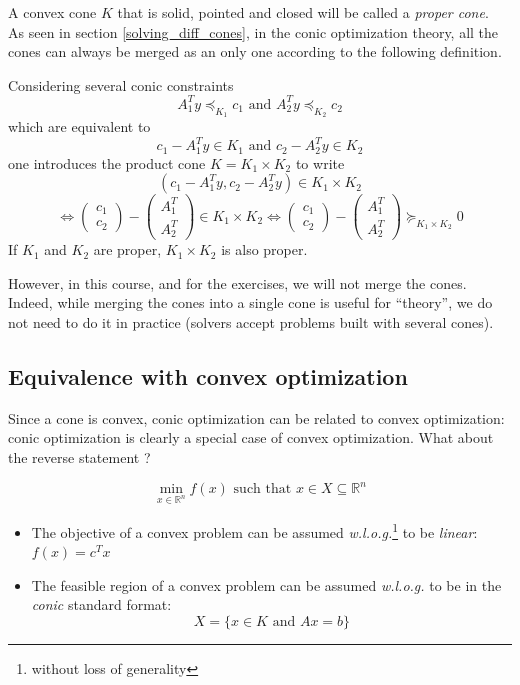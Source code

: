 A convex cone $K$ that is solid, pointed and closed will be called a \emph{proper cone}.\\

As seen in section \ref{solving_diff_cones}, in the conic optimization theory, all the cones can always be merged as an only one according to the following definition.\\

\begin{definition} 
Considering several conic constraints \[ A_1^T y \preceq_{K_1} c_1
\text{ and } A_2^T y \preceq_{K_2} c_2 \] which are equivalent to
\[ c_1 - A_1^T y \in K_1 \text{ and } c_2 - A_2^T y \in K_2 \] one
introduces the product cone $K = K_1 \times K_2$ to write
\[ (c_1 - A_1^T y, c_2 - A_2^T y) \in K_1 \times K_2
\] \[ \Leftrightarrow \begin{pmatrix} c_1 \\ c_2
\end{pmatrix} -
\begin{pmatrix} A_1^T \\ A_2^T \end{pmatrix} \in K_1 \times K_2
\Leftrightarrow
 \begin{pmatrix} c_1 \\ c_2 \end{pmatrix} -
\begin{pmatrix} A_1^T \\ A_2^T \end{pmatrix} \succeq_{K_1 \times K_2} 0 \]
If $K_1$ and $K_2$ are proper, $K_1 \times K_2$ is also proper.
\end{definition}

However, in this course, and for the exercises, we will not merge the cones. Indeed, while merging the cones into a single cone is useful for ``theory'', we do not need to do it in practice (solvers accept problems built with several cones).

\subsection{Equivalence with convex optimization} 
Since a cone is convex, conic optimization can be related to convex optimization: conic optimization is clearly a special case of convex optimization. What about the reverse statement ?

\[ \min_{x \in \mathbb{R}^n} f(x) \text{ such that } x \in X \subseteq
\mathbb{R}^n \]

\begin{itemize}
\item The objective of a convex problem can be assumed
\emph{w.l.o.g.}\footnote{without loss of generality} to be \emph{linear}: $f(x) = c^T x$

\item The feasible region of a convex problem can be assumed
\emph{w.l.o.g.} to be in the \emph{conic} standard format: \[ X
= \{ x \in K \text{ and } A x = b \} \]
\end{itemize}

